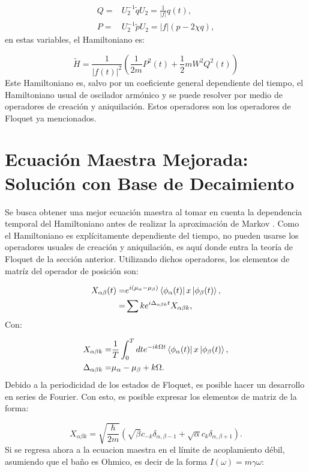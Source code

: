\documentclass[a4paper,10pt]{report}
\begin{document}
\begin{align}
Q=&U_2^{-1}\tilde{q}U_2 =\frac{1}{|f|}q(t),\\
P=&U_2^{-1}\tilde{p}U_2 = |f|(p-2\chi q), 
\end{align} en estas variables, el Hamiltoniano es:

\begin{equation}\label{QTDHO}
\tilde{H} = \frac{1}{|f(t)|^2}(\frac{1}{2m}P^2(t)+\frac{1}{2}mW^2Q^2(t))
\end{equation}Este Hamiltoniano es, salvo por un coeficiente general dependiente del tiempo, el Hamiltoniano usual de oscilador armónico y se puede resolver por medio de operadores de creación y aniquilación. Estos operadores son los operadores de Floquet ya mencionados.

\section{Ecuación Maestra Mejorada: Solución con Base de Decaimiento}

Se busca obtener una mejor ecuación maestra al tomar en cuenta la dependencia temporal del Hamiltoniano antes de realizar la aproximación de Markov \cite{HanngiDQS}. Como el Hamiltoniano es explícitamente dependiente del tiempo, no pueden usarse los operadores usuales de creación y aniquilación, es aquí donde entra la teoría de Floquet de la sección anterior. Utilizando dichos operadores, los elementos de matríz del operador de posición son:

\begin{align}
X_{\alpha \beta}(t) =& e^{i(\mu_{\alpha}-\mu_{\beta})}\Bra{\phi_{\alpha}(t)}x\Ket{\phi_{\beta}(t)},\\
=& \sum{k} e^{i\Delta_{\alpha\beta k}t} X_{\alpha\beta k},
\end{align}Con:

\begin{align*}
X_{\alpha\beta k} =& \frac{1}{T} \int_0^T dt e^{-ik\Omega t}\Bra{\phi_{\alpha}(t)}x\Ket{\phi_{\beta}(t)}, \\
\Delta_{\alpha \beta k} =& \mu_{\alpha}-\mu_{\beta} + k\Omega.
\end{align*}Debido a la periodicidad de los estados de Floquet, es posible hacer un desarrollo en series de Fourier. Con esto, es posible expresar los elementos de matriz de la forma:

\begin{equation}
X_{\alpha\beta k} = \sqrt{\frac{\hbar}{2m}}(\sqrt{\beta}c_{-k} \delta_{\alpha,\beta-1}+\sqrt{\alpha}c_k\delta_{\alpha,\beta+1}).
\end{equation} Si se regresa ahora a la ecuacion maestra en el límite de acoplamiento débil, asumiendo que el baño es Ohmico, es decir de la forma $I(\omega) = m\gamma \omega$:
\end{document}
